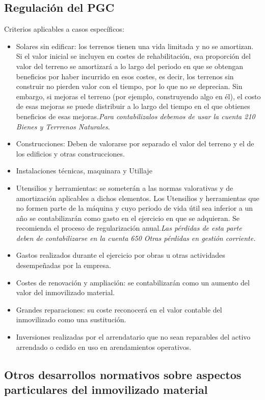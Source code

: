 \documentclass[a4paper,12pt]{article}
\begin{document}
\subsection{Regulación del PGC}
Criterios aplicables a casos específicos:
\begin{itemize}
    \item Solares sin edificar: los terrenos tienen una vida limitada y no se amortizan. Si el valor inicial se incluyen en costes de rehabilitación, esa proporción del valor del terreno se amortizará a lo largo del periodo en que se obtengan beneficios por haber incurrido en esos costes, es decir, los terrenos sin construir no pierden valor con el tiempo, por lo que no se deprecian. Sin embargo, si mejoras el terreno (por ejemplo, construyendo algo en él), el costo de esas mejoras se puede distribuir a lo largo del tiempo en el que obtienes beneficios de esas mejoras.\textit{Para contabilizalos debemos de usar la cuenta 210 Bienes y Terrrenos Naturales}.
    \item Construcciones: Deben de valorarse por separado el valor del terreno y el de los edificios y otras construcciones.
    \item Instalaciones técnicas, maquinara y Utillaje
    \item Utensilios y herramientas: se someterán a las normas valorativas y de amortización aplicables a dichos elementos. Los Utensilios y herramientas que no formen parte de la máquina y cuyo periodo de vida útil sea inferior a un año se contabilizarán como gasto en el ejercicio en que se adquieran. Se recomienda el proceso de regularización anual.\textit{Las pérdidas de esta parte deben de contabilizarse en la cuenta 650 Otras pérdidas en gestión corriente.}
    \item Gastos realizados durante el ejercicio por obras u otras actividades desempeñadas por la empresa.
    \item Costes de renovación y ampliación: se contabilizarán como un aumento del valor del inmovilizado material.
    \item Grandes reparaciones: su coste reconocerá en el valor contable del inmovilizado como una sustitución.
    \item Inversiones realizadas por el arrendatario que no sean reparables del activo arrendado o cedido en uso en arendamientos operativos.
\end{itemize}

\subsection{Otros desarrollos normativos sobre aspectos particulares del inmovilizado material}
\end{document}
